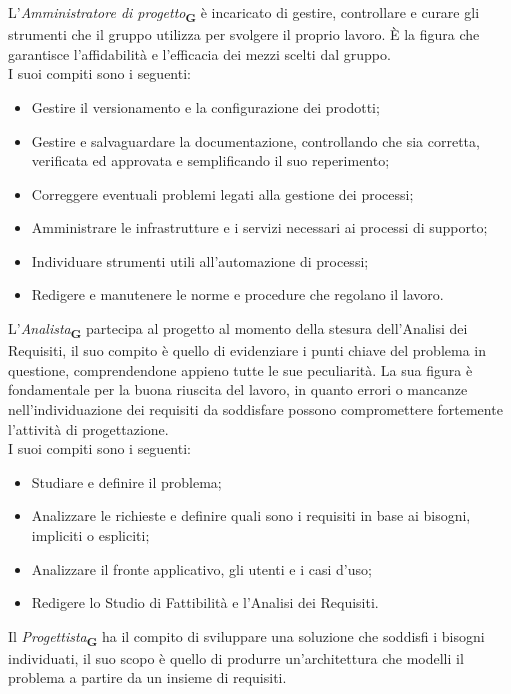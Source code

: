 L’\textit{Amministratore di progetto}\textsubscript{\textbf{G}} è incaricato di gestire, controllare e curare gli strumenti che il gruppo utilizza per svolgere il proprio lavoro. È la figura che garantisce l’affidabilità e l’efficacia dei mezzi scelti dal gruppo.\\
I suoi compiti sono i seguenti:
\begin {itemize}
\item Gestire il versionamento e la configurazione dei prodotti;
\item Gestire e salvaguardare la documentazione, controllando che sia corretta, verificata ed approvata e semplificando il suo reperimento;
\item Correggere eventuali problemi legati alla gestione dei processi;
\item Amministrare le infrastrutture e i servizi necessari ai processi di supporto;
\item Individuare strumenti utili all'automazione di processi;
\item Redigere e manutenere le norme e procedure che regolano il lavoro.
\end {itemize}
L'\textit{Analista}\textsubscript{\textbf{G}} partecipa al progetto al momento della stesura dell’Analisi dei Requisiti, il suo compito è quello di evidenziare i punti chiave del problema in questione, comprendendone appieno tutte le sue peculiarità. La sua figura è fondamentale per la buona riuscita del lavoro, in quanto errori o mancanze nell’individuazione dei requisiti da soddisfare possono compromettere fortemente l'attività di progettazione.\\
I suoi compiti sono i seguenti:
\begin {itemize}
\item Studiare e definire il problema;
\item Analizzare le richieste e definire quali sono i requisiti in base ai bisogni, impliciti o espliciti;
\item Analizzare il fronte applicativo, gli utenti e i casi d’uso;
\item Redigere lo Studio di Fattibilità e l’Analisi dei Requisiti.
\end {itemize}
Il \textit{Progettista}\textsubscript{\textbf{G}} ha il compito di sviluppare una soluzione che soddisfi i bisogni individuati, il suo scopo è quello di produrre un’architettura che modelli il problema a partire da un insieme di requisiti.\\
